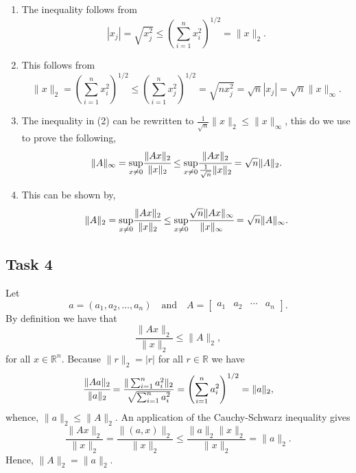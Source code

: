 \documentclass[a4paper,12pt]{article}
\begin{document}
\begin{enumerate}
  \item
    The inequality follows from
    \[
      |x_j|
        = \sqrt{x_j^2}
        \le \left(\sum_{i=1}^n x_i^2\right)^{1/2}
        = \|x\|_2.
    \]

  \item
    This follows from
    \[
      \|x\|_2
        = \left(\sum_{i=1}^n x_i^2\right)^{1/2}
        \le \left(\sum_{i=1}^n x_j^2\right)^{1/2}
        = \sqrt{nx_j^2}
        = \sqrt{n}|x_j|
        = \sqrt{n}\|x\|_\infty.
    \]

  \item
  The inequality in (2) can be rewritten to $ \frac{1}{\sqrt{n}} \|x\|_2 \le \|x\|_\infty$, this do we use to prove the following,
  \[
  \|A\|_\infty =\underset{x\not=0}{\sup} \cfrac{\|Ax\|_2}{\|x\|_2}\le \underset{x\not=0}{\sup} \cfrac{\|Ax\|_2}{\frac{1}{\sqrt{n}}\|x\|_2}=\sqrt{n}\|A\|_2.
  \]
  
  
  \iffalse
    The maximum preserves inequalities, so by 1 we have:
    \[
      \|A\|_\infty
        = \max_{\|x\| = 1} \|Ax\|_\infty
        \le \max_{\|x\| = 1} \|Ax\|_2
        = \|A\|_2,
    \]
    and obviously \(\|A\|_2 \le \sqrt{n}\|A\|_2\).
  \fi
  \item
  
  This can be shown by,
  \[
  \|A\|_2=\underset{x\not=0}{\sup} \cfrac{\|Ax\|_2}{\|x\|_2}\le \underset{x\not=0}{\sup} \cfrac{\sqrt{n}\|Ax\|_\infty}{\|x\|_\infty} =\sqrt{n}\|A\|_\infty.
  \]
  \iffalse
    Again by the fact that the maximum preserves inequalities, 2 gives
    \begin{align*}
      \|A\|_2
      &= \max_{\|x\| = 1} \|Ax\|_2 \\
      &\le \max_{\|x\| = 1} \sqrt{n}\|Ax\|_\infty \\
      &= \sqrt{n} \max_{\|x\| = 1} \|Ax\|_\infty \\
      &= \sqrt{n} \|Ax\|_\infty.
    \end{align*}
  \fi
\end{enumerate}


\subsection*{Task 4}

Let
\[
  a = (a_1, a_2, \dots, a_n)
  \quad \text{and} \quad
  A =
    \begin{bmatrix}
      a_1 & a_2 & \cdots & a_n
    \end{bmatrix}.
\]
By definition we have that
\[ \frac{\|Ax\|_2}{\|x\|_2} \le \|A\|_2, \]
for all \(x\in \mathbb{R}^n\).
Because \(\|r\|_2 = |r|\) for all \(r \in \mathbb{R}\) we have
\[
  \cfrac{\|Aa\|_2}{\|a\|_2}
    = \frac{\|\sum_{i=1}^n a_i^2\|_2}{\sqrt{\sum_{i=1}^n a_i^2}}
    = \left(\sum_{i=1}^{n} a_i^2\right)^{1/2}
    = \|a\|_2,
\]
whence, \(\|a\|_2\le \|A\|_2\).
An application of the Cauchy-Schwarz inequality gives
\[
  \frac{\|Ax\|_2}{\|x\|_2}
    = \frac{\|(a,x)\|_2}{\|x\|_2}
    \le \frac{\|a\|_2 \|x\|_2}{\|x\|_2}
    = \|a\|_2.
\]
Hence, \(\|A\|_2= \|a\|_2\).
\end{document}
